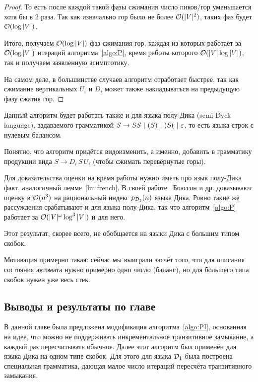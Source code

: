 \begin{proof}

  То есть после каждой такой фазы сжимания число пиков/гор уменьшается хотя бы в 2 раза. Так как изначально гор было не более $\mathcal{O}(|V|^2)$, таких фаз будет $\mathcal{O}(\log |V|)$.

  Итого, получаем $\mathcal{O}(\log |V|)$ фаз сжимания гор, каждая из которых работает за $\mathcal{O}(\log |V|)$ итераций алгоритма~\ref{algo:P}, время работы которого $\mathcal{O}(|V| \log |V|)$, так и получаем заявленную асимптотику.

  На самом деле, в большинстве случаев алгоритм отработает быстрее, так как сжимание вертикальных $U_i$ и $D_i$ может также накладываться на предыдущую фазу сжатия гор.

\end{proof}

\begin{note}
  Данный алгоритм будет работать также и для языка полу-Дика (semi-Dyck language), задаваемого грамматикой $S \rightarrow SS ~|~ ( S ) ~|~ ) S ( ~|~ \varepsilon$, то есть языка строк с нулевым балансом.

  Понятно, что алгоритм придётся видоизменить, а именно, добавить в грамматику продукции вида $S \to D_i\, S\, U_i$ (чтобы сжимать перевёрнутые горы). 

  Для доказательства оценки на время работы нужно иметь про язык полу-Дика факт, аналогичный лемме~\ref{lm:french}. В своей работе~\cite{Boasson1981} Боассон и др. доказывают оценку в $\mathcal{O}(n^3)$ на рациональный индекс $p_{\mathcal{D}_1}(n)$ языка Дика. Ровно такие же рассуждения срабатывают и для языка полу-Дика, так что алгоритм~\ref{algo:P} работает за $\mathcal{O}(|V|^{\omega} \log^3 |V|)$ и для него.
\end{note}

\begin{note}
  Этот результат, скорее всего, не обобщается на языки Дика с большим типом скобок. 

  Мотивация примерно такая: сейчас мы выиграли засчёт того, что для описания состояния автомата нужно примерно одно число (баланс), но для большего типа скобок нужен уже весь стек.
\end{note}

\subsection{Выводы и результаты по главе}

В данной главе была предложена модификация алгоритма~\ref{algo:PI}, основанная на идее, что можно не поддерживать инкрементальное транзитивное замыкание, а каждый раз пересчитывать обычное. Далее этот алгоритм был применён для языка Дика на одном типе скобок. Для этого для языка $\mathcal{D}_1$ была построена специальная грамматика, дающая малое число итераций пересчёта транзитивного замыкания.


